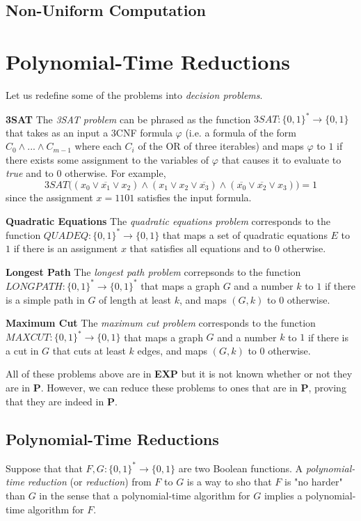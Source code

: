 \documentclass[a4paper, 12pt]{report}
\theoremstyle{remark}
\theoremstyle{definition}
\begin{document}
\subsection{Non-Uniform Computation}

\section{Polynomial-Time Reductions}
Let us redefine some of the problems into \textit{decision problems}. 

\textbf{3SAT} The \textit{3SAT problem} can be phrased as the function $3SAT: \{0,1\}^* \longrightarrow \{0,1\}$ that takes as an input a 3CNF formula $\varphi$ (i.e. a formula of the form $C_0 \wedge ... \wedge C_{m-1}$ where each $C_i$ of the OR of three iterables) and maps $\varphi$ to $1$ if there exists some assignment to the variables of $\varphi$ that causes it to evaluate to \textit{true} and to $0$ otherwise. For example, 
\[3SAT \big( (x_0 \vee \overline{x_1} \vee x_2) \wedge (x_1 \vee x_2 \vee \overline{x_3}) \wedge (\overline{x_0} \vee \overline{x_2} \vee x_3) \big) = 1\]
since the assignment $x = 1101$ satisfies the input formula. 

\textbf{Quadratic Equations} The \textit{quadratic equations problem} corresponds to the function $QUADEQ: \{0,1\}^* \longrightarrow \{0,1\}$ that maps a set of quadratic equations $E$ to $1$ if there is an assignment $x$ that satisfies all equations and to $0$ otherwise. 

\textbf{Longest Path} The \textit{longest path problem} correpsonds to the function $LONGPATH: \{0,1\}^* \longrightarrow \{0,1\}^*$ that maps a graph $G$ and a number $k$ to $1$ if there is a simple path in $G$ of length at least $k$, and maps $(G, k)$ to $0$ otherwise. 

\textbf{Maximum Cut} The \textit{maximum cut problem} corresponds to the function $MAXCUT: \{0,1\}^* \longrightarrow \{0,1\}$ that maps a graph $G$ and a number $k$ to $1$ if there is a cut in $G$ that cuts at least $k$ edges, and maps $(G, k)$ to $0$ otherwise. 

All of these problems above are in \textbf{EXP} but it is not known whether or not they are in \textbf{P}. However, we can reduce these problems to ones that are in \textbf{P}, proving that they are indeed in \textbf{P}. 

\subsection{Polynomial-Time Reductions}
Suppose that that $F, G: \{0,1\}^* \longrightarrow \{0,1\}$ are two Boolean functions. A \textit{polynomial-time reduction} (or \textit{reduction}) from $F$ to $G$ is a way to sho that $F$ is "no harder" than $G$ in the sense that a polynomial-time algorithm for $G$ implies a polynomial-time algorithm for $F$. 
\end{document}
